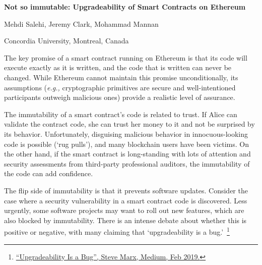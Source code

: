 \documentclass[a4paper]{article}
\newcommand{\eg}{\textit{e.g.,}\xspace}
\begin{document}

\Large
 \begin{center}
\textbf{Not so immutable: Upgradeability of Smart Contracts on Ethereum}\\ 

\hspace{10pt}

\large
Mehdi Salehi, Jeremy Clark, Mohammad Mannan \\

\hspace{10pt}

\small  
 Concordia University, Montreal, Canada

\end{center}

\hspace{10pt}

\normalsize

The key promise of a smart contract running on Ethereum is that its code will execute exactly as it is written, and the code that is written can never be changed. While Ethereum cannot maintain this promise unconditionally, its assumptions (\eg cryptographic primitives are secure and well-intentioned participants outweigh malicious ones) provide a realistic level of assurance. 

The immutability of a smart contract's code is related to trust. If Alice can validate the contract code, she can trust her money to it and not be surprised by its behavior. Unfortunately, disguising malicious behavior in innocuous-looking code is possible (`rug pulls'), and many blockchain users have been victims. On the other hand, if the smart contract is long-standing with lots of attention and security assessments from third-party professional auditors, the immutability of the code can add confidence. 

The flip side of immutability is that it prevents software updates. Consider the case where a security vulnerability in a smart contract code is discovered. Less urgently, some software projects may want to roll out new features, which are also blocked by immutability. There is an intense debate about whether this is positive or negative, with many claiming that `upgradeability is a bug.'~\footnote{\href{https://medium.com/consensys-diligence/upgradeability-is-a-bug-dba0203152ce}{``Upgradeability Is a Bug'', Steve Marx, Medium, Feb 2019.}} 
\end{document}
